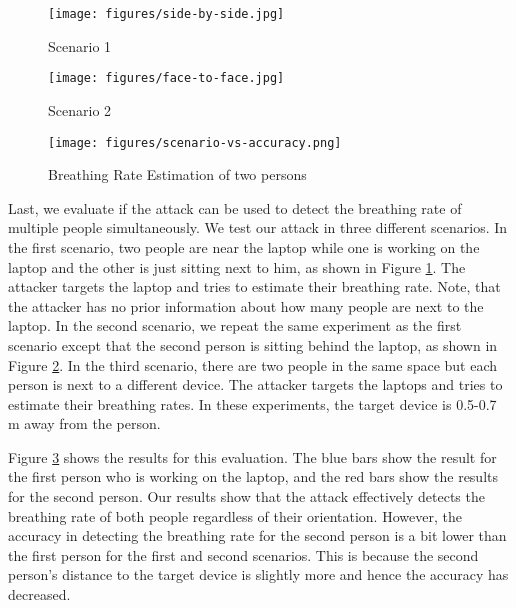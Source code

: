 \begin{figure*}[!t]
    \centering
    \begin{subfigure}[b]{0.19\textwidth}
        \centering 
        \texttt{[image: figures/side-by-side.jpg]}
        \caption{Scenario 1}
        \label{fig:scene1}
    \end{subfigure}
    \hfill
    \begin{subfigure}[b]{0.34\textwidth}
        \centering
        \texttt{[image: figures/face-to-face.jpg]}
        \caption{Scenario 2}
        \label{fig:scene2}
    \end{subfigure}
    \begin{subfigure}[b]{0.4\textwidth}
        \centering
        \texttt{[image: figures/scenario-vs-accuracy.png]}
        \vspace{-18pt}
        \caption{Breathing Rate Estimation of two persons}
        \label{fig:scenarios_vs_accuracy}
    \end{subfigure}
    \caption{Accuracy under three different scenarios: Scenario 1: two people sit side-by-side in front of the target device; Scenario 2: one person sits in front of the target device, the other one sits behind the target device; Scenario 3: two people sit in front of two target devices, respectively. Attacker attacks one by one.}
    \label{fig:two-scenes}
\end{figure*}
Last, we evaluate if the attack can be used to detect the breathing rate of multiple people simultaneously. We test our attack in three different scenarios. In the first scenario, two people are near the laptop while one is working on the laptop and the other is just sitting next to him, as shown in Figure \ref{fig:scene1}. The attacker targets the laptop and tries to estimate their breathing rate. Note, that the attacker has no prior information about how many people are next to the laptop. In the second scenario, we repeat the same experiment as the first scenario except that the second person is sitting behind the laptop, as shown in Figure \ref{fig:scene2}. In the third scenario, there are two people in the same space but each person is next to a different device. The attacker targets the laptops and tries to estimate their breathing rates. In these experiments, the target device is 0.5-0.7 m away from the person. 

Figure \ref{fig:scenarios_vs_accuracy} shows the results for this evaluation. The blue bars show the result for the first person who is working on the laptop, and the red bars show the results for the second person. Our results show that the attack effectively detects the breathing rate of both people regardless of their orientation. However, the accuracy in detecting the breathing rate for the second person is a bit lower than the first person for the first and second scenarios. This is because the second person's distance to the target device is slightly more and hence the accuracy has decreased. 

